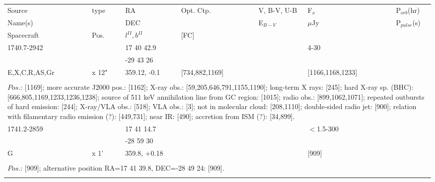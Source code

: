 \documentclass{aa}
\begin{document}
\begin{tabular}{p{2.5cm}p{1cm}p{1.8cm}p{2.3cm}p{3.3cm}p{2.0cm}p{2.2cm}}
\noalign{\smallskip}
\multicolumn{7}{p{17.5cm}}{Table 1.  (continued) }\\        
\hline
\noalign{\smallskip}
Source         & type  & RA                       &  Opt. Ctp. & V, B-V, U-B  & F$_{x}$          & P$_{orb}$(hr)    \\
Name(s)       &            & DEC                    &                     & E$_{B-V}$   & $\mu$Jy        & P$_{pulse}$(s) \\
Spacecraft & Pos.  & $l^{II}, b^{II}$      &  [FC]           &                        &                         &                             \\
\noalign{\smallskip} 
\hline

\noalign{\smallskip}
1740.7-2942     &                     & 17 40 42.9            &                                &                         & 4-30                            &       \\
                            &                     & -29 43 26             &                                 &                         &                                     &      \\
E,X,C,R,AS,Gr & x 12"          & 359.12, -0.1         & [734,882,1169]     &                         & [1166,1168,1233]    &   \\
\\ 
\multicolumn{7}{p{17.5cm}}{
$Pos$.: [1169]; more accurate J2000 pos.: [1162]; X-ray obs.: [59,205,646,791,1155,1190]; long-term X rays: [245]; hard 
X-ray sp. (BHC): [666,805,1169,1233,1236,1238]; source of 511 keV annihilation line from GC region: [1015]; radio obs.: 
[899,1062,1071]; repeated outbursts of hard emission: [244]; X-ray/VLA obs.: [518]; VLA obs.: [3]; not in molecular 
cloud: [208,1110]; double-sided radio jet: [900]; relation with filamentary radio emission (?): [449,731]; near IR: [490]; 
accretion from ISM (?): [34,899].}\\
\noalign{\smallskip}
\hline

\noalign{\smallskip}
1741.2-2859   &                   & 17 41 14.7            &                     &                         & $<$1.5-300  &       \\
                         &                    & -28 59 30             &                     &                          &                        &      \\
G                      & x 1'            & 359.8, +0.18         &                     &                         & [909]              &       \\
\\
\multicolumn{7}{p{17.5cm}}{
$Pos$.: [909]; alternative position RA=17 41 39.8, DEC=-28 49 24: [909].}\\
\noalign{\smallskip}
\hline


\end{tabular}
\end{document}
